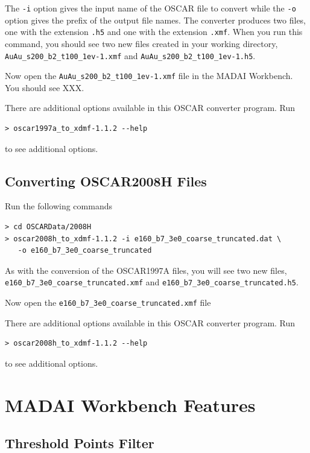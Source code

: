 \documentclass[12pt]{article}
\begin{document}
The \texttt{-i} option gives the input name of the OSCAR file to convert while the \texttt{-o} option gives the prefix of the output file names. The converter produces two files, one with the extension \texttt{.h5} and one with the extension \texttt{.xmf}. When you run this command, you should see two new files created in your working directory, \texttt{AuAu\_s200\_b2\_t100\_1ev-1.xmf} and \texttt{AuAu\_s200\_b2\_t100\_1ev-1.h5}.

Now open the \texttt{AuAu\_s200\_b2\_t100\_1ev-1.xmf} file in the MADAI Workbench. You should see XXX.

There are additional options available in this OSCAR converter program. Run

\begin{verbatim}
> oscar1997a_to_xdmf-1.1.2 --help
\end{verbatim}
to see additional options.

\subsection{Converting OSCAR2008H Files}

Run the following commands

\begin{verbatim}
> cd OSCARData/2008H
> oscar2008h_to_xdmf-1.1.2 -i e160_b7_3e0_coarse_truncated.dat \
   -o e160_b7_3e0_coarse_truncated
\end{verbatim}

As with the conversion of the OSCAR1997A files, you will see two new files, \\ \texttt{e160\_b7\_3e0\_coarse\_truncated.xmf} and \texttt{e160\_b7\_3e0\_coarse\_truncated.h5}.

Now open the \texttt{e160\_b7\_3e0\_coarse\_truncated.xmf} file 

There are additional options available in this OSCAR converter program. Run

\begin{verbatim}
> oscar2008h_to_xdmf-1.1.2 --help
\end{verbatim}
to see additional options.

\section{MADAI Workbench Features}

\subsection{Threshold Points Filter}
\end{document}
